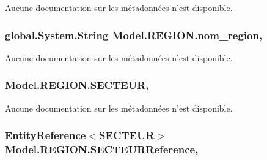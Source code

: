 Aucune documentation sur les métadonnées n'est disponible. 

\hypertarget{class_model_1_1_r_e_g_i_o_n_a4dceb2c8c2a0b59bd07caba731ff984a}{
\subsubsection[{nom\-\_\-region}]{\setlength{\rightskip}{0pt plus 5cm}global.\-System.\-String Model.\-R\-E\-G\-I\-O\-N.\-nom\-\_\-region\hspace{0.3cm}{\ttfamily [get]}, {\ttfamily [set]}}}\label{class_model_1_1_r_e_g_i_o_n_a4dceb2c8c2a0b59bd07caba731ff984a}


Aucune documentation sur les métadonnées n'est disponible. 

\hypertarget{class_model_1_1_r_e_g_i_o_n_a1a0c5b20ed4f339d95de08844b77b5b6}{
\subsubsection[{S\-E\-C\-T\-E\-U\-R}]{ Model.\-R\-E\-G\-I\-O\-N.\-S\-E\-C\-T\-E\-U\-R\hspace{0.3cm}{\ttfamily [get]}, {\ttfamily [set]}}}\label{class_model_1_1_r_e_g_i_o_n_a1a0c5b20ed4f339d95de08844b77b5b6}


Aucune documentation sur les métadonnées n'est disponible. 

\hypertarget{class_model_1_1_r_e_g_i_o_n_a30e268a49e6d95f6de38d81b420fc3b3}{
\subsubsection[{S\-E\-C\-T\-E\-U\-R\-Reference}]{\setlength{\rightskip}{0pt plus 5cm}Entity\-Reference$<${\bf S\-E\-C\-T\-E\-U\-R}$>$ Model.\-R\-E\-G\-I\-O\-N.\-S\-E\-C\-T\-E\-U\-R\-Reference\hspace{0.3cm}{\ttfamily [get]}, {\ttfamily [set]}}}\label{class_model_1_1_r_e_g_i_o_n_a30e268a49e6d95f6de38d81b420fc3b3}



